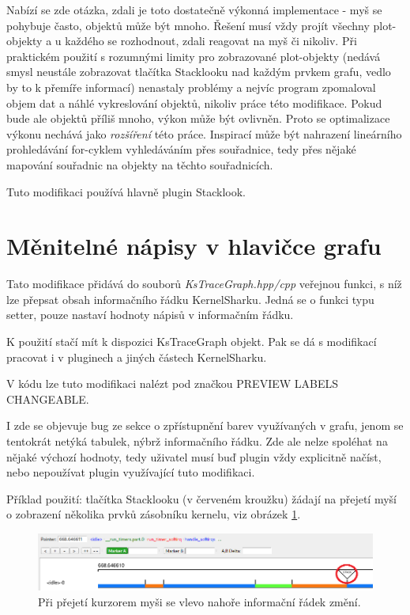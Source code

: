 Nabízí se zde otázka, zdali je toto dostatečně výkonná implementace - myš se pohybuje často, objektů může být mnoho. Řešení musí vždy projít všechny plot-objekty a u každého se rozhodnout, zdali reagovat na myš či nikoliv. Při praktickém použití s rozumnými limity pro zobrazované plot-objekty (nedává smysl neustále zobrazovat tlačítka Stacklooku nad každým prvkem grafu, vedlo by to k přemíře informací) nenastaly problémy a nejvíc program zpomaloval objem dat a náhlé vykreslování objektů, nikoliv práce této modifikace. Pokud bude ale objektů příliš mnoho, výkon může být ovlivněn. Proto se optimalizace výkonu nechává jako \emph{rozšíření} této práce. Inspirací může být nahrazení lineárního prohledávání for-cyklem vyhledáváním přes souřadnice, tedy přes nějaké mapování souřadnic na objekty na těchto souřadnicích.

Tuto modifikaci používá hlavně plugin Stacklook.

\section{Měnitelné nápisy v hlavičce grafu}

Tato modifikace přidává do souborů \emph{KsTraceGraph.hpp/cpp} veřejnou funkci, s níž lze přepsat obsah informačního řádku KernelSharku. Jedná se o funkci typu setter, pouze nastaví hodnoty nápisů v informačním řádku.

K použití stačí mít k dispozici KsTraceGraph objekt. Pak se dá s modifikací pracovat i v pluginech a jiných částech KernelSharku.

V kódu lze tuto modifikaci nalézt pod značkou PREVIEW LABELS CHANGEABLE.

I zde se objevuje bug ze sekce o zpřístupnění barev využívaných v grafu, jenom se tentokrát netýká tabulek, nýbrž informačního řádku. Zde ale nelze spoléhat na nějaké výchozí hodnoty, tedy uživatel musí buď plugin vždy explicitně načíst, nebo nepoužívat plugin využívající tuto modifikaci.

Příklad použití: tlačítka Stacklooku (v červeném kroužku) žádají na přejetí myší o zobrazení několika prvků zásobníku kernelu, viz obrázek \ref{obr02:modif-preview-labels-changeable}.

\begin{figure}[p]\centering
    \includegraphics[width=140mm]{img/modif-preview-labels-changeable.png}
    \caption{Při přejetí kurzorem myši se vlevo nahoře informační řádek změní.}
    \label{obr02:modif-preview-labels-changeable}
\end{figure}

